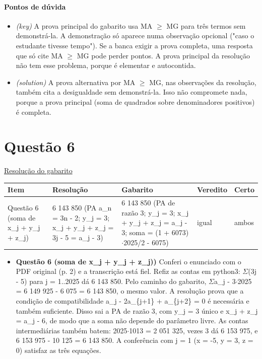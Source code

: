\documentclass{article}%
\begin{document}
\paragraph{Pontos de dúvida}%
\begin{itemize}%
\item%
\textit{(key)} A prova principal do gabarito usa MA $\geq$ MG para três termos sem demonstrá{-}la. A demonstração só aparece numa observação opcional ("caso o estudante tivesse tempo"). Se a banca exigir a prova completa, uma resposta que só cite MA $\geq$ MG pode perder pontos. A prova principal da resolução não tem esse problema, porque é elementar e autocontida.%
\item%
\textit{(solution)} A prova alternativa por MA $\geq$ MG, nas observações da resolução, também cita a desigualdade sem demonstrá{-}la. Isso não compromete nada, porque a prova principal (soma de quadrados sobre denominadores positivos) é completa.%
\end{itemize}%
\section*{Questão 6}%
\href{https://poliedroresolve.sistemapoliedro.com.br/vestibulares/ime/2026/ime-2-fase-dia-1-23-10-2025-2-fase-dia-1/dissertativa-6-matematica-2-fase-dia-1-ime-2026}{Resolução do gabarito}\par\smallskip%
\begin{longtable}{@{}p{} p{} p{} p{} p{}@{}}\toprule Item & Resolução & Gabarito & Veredito & Certo \\ \midrule
Questão 6 (soma de x\_j + y\_j + z\_j) & 6 143 850 (PA a\_n = 3n - 2; y\_j = 3; x\_j + y\_j + z\_j = 3j - 5 = a\_j - 3) & 6 143 850 (PA de razão 3; y\_j = 3; x\_j + y\_j + z\_j = a\_j - 3; soma = (1 + 6073)$\cdot$2025/2 - 6075) & igual & ambos \\
\bottomrule\end{longtable}%
\begin{itemize}%
\item%
\textbf{Questão 6 (soma de x\_j + y\_j + z\_j))} Conferi o enunciado com o PDF original (p. 2) e a transcrição está fiel. Refiz as contas em python3: $\Sigma$(3j - 5) para j = 1..2025 dá 6 143 850. Pelo caminho do gabarito, $\Sigma$a\_j - 3$\cdot$2025 = 6 149 925 - 6 075 = 6 143 850, o mesmo valor. A resolução prova que a condição de compatibilidade a\_j - 2a\_\{j+1\} + a\_\{j+2\} = 0 é necessária e também suficiente. Disso sai a PA de razão 3, com y\_j = 3 único e x\_j + z\_j = a\_j - 6, de modo que a soma não depende do parâmetro livre. As contas intermediárias também batem: 2025$\cdot$1013 = 2 051 325, vezes 3 dá 6 153 975, e 6 153 975 - 10 125 = 6 143 850. A conferência com j = 1 (x = -5, y = 3, z = 0) satisfaz as três equações.%
\end{itemize}%
\end{document}
